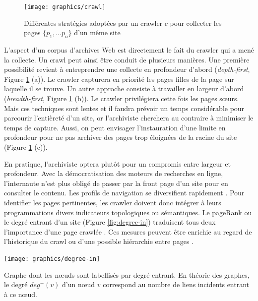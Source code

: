 \documentclass[symmetric,justified,marginals=raggedouter]{tufte-book}
\begin{document}
\begin{figure}%
  \texttt{[image: graphics/crawl]}
  \caption{Différentes stratégies adoptées par un crawler $c$ pour collecter les pages $\{p_1,...p_n\}$ d'un même site}
  \label{fig:crawl}
\end{figure}

\noindent L'aspect d'un corpus d'archives Web est directement le fait du crawler qui a mené la collecte. Un crawl peut ainsi être conduit de plusieurs manières. Une première possibilité revient à entreprendre une collecte en profondeur d'abord (\textit{depth-first}, Figure \ref{fig:crawl} (a)). Le crawler capturera en priorité les pages filles de la page sur laquelle il se trouve. Un autre approche consiste à travailler en largeur d'abord (\textit{breadth-first}, Figure \ref{fig:crawl} (b)). Le crawler privilégiera cette fois les pages sœurs. Mais ces techniques sont lentes et il faudra prévoir un temps considérable pour parcourir l'entièreté d'un site, or l'archiviste cherchera au contraire à minimiser le temps de capture. Aussi, on peut envisager l'instauration d'une limite en profondeur pour ne pas archiver des pages trop éloignées de la racine du site (Figure \ref{fig:crawl} (c)).

En pratique, l'archiviste optera plutôt pour un compromis entre largeur et profondeur. Avec la démocratisation des moteurs de re\-cherches en ligne, l'internaute n'est plus obligé de passer par la front page d'un site pour en consulter le contenu. Les profils de navigation se diversifient rapidement \citep{holscher_web_2000}. Pour identifier les pages pertinentes, les crawler doivent donc intégrer à leurs programmations divers indicateurs topologiques ou sémantiques. Le pageRank \citep{page_pagerank_1999} ou le degré entrant d'un site (Figure \ref{fig:degree-in}) traduisent tous deux l'importance d'une page crawlée \citep{cho_efficient_1998}. Ces mesures peuvent être enrichie au regard de l'historique du crawl ou d'une possible hiérarchie entre pages \citep{baeza-yates_crawling_2005}. 

\begin{marginfigure}%
  \texttt{[image: graphics/degree-in]}
  \caption{Graphe dont les nœuds sont labellisés par degré entrant. En théorie des graphes, le degré $deg^-(v)$ d'un nœud $v$ correspond au nombre de liens incidents entrant à ce nœud.}
  \label{fig:degree-in}
\end{marginfigure} 
\end{document}
